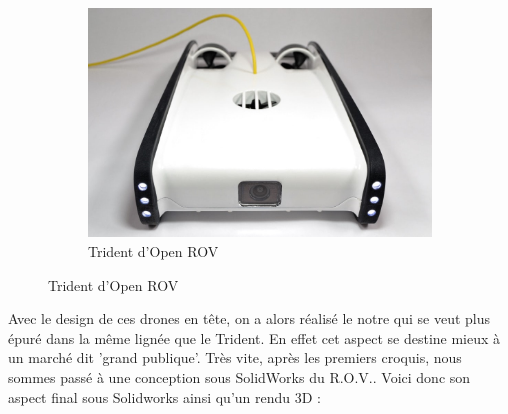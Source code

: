 \documentclass[a4paper,11pt]{report}
\begin{document}
\begin{figure}[!h]
\begin{subfigure}[b]{0.3\textwidth}
								\includegraphics[width=\textwidth]{Photos/openrov-trident-rov-2.jpg}
								\caption{Trident d'Open ROV}
							\end{subfigure}
					\end{figure}\newpage
					
					Avec le design de ces drones en tête, on a alors réalisé le notre qui se veut plus épuré dans la même lignée que le Trident. En effet cet aspect se destine mieux à un marché dit 'grand publique'. Très vite, après les premiers croquis, nous sommes passé à une conception sous SolidWorks du R.O.V.. Voici donc son aspect final sous Solidworks ainsi qu'un rendu 3D : 
					
\end{document}
